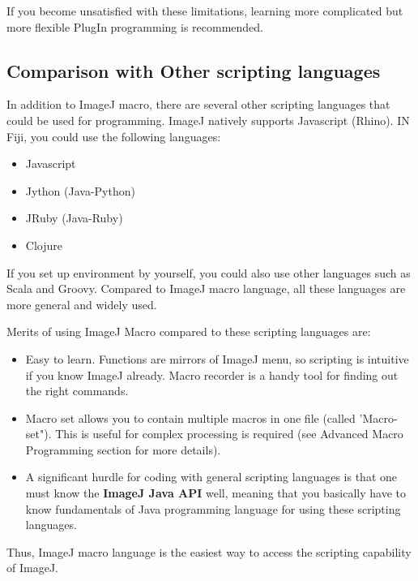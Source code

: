 \documentclass[11pt,a4paper,oneside]{report}
\begin{document}
If you become unsatisfied with these limitations, 
learning more complicated but more flexible PlugIn programming is recommended. 

\subsection{Comparison with Other scripting languages}
In addition to ImageJ macro, there are several other scripting languages that
could be used for programming. ImageJ natively supports Javascript (Rhino).
IN Fiji, you could use the following languages:

\begin{itemize}
 \item Javascript
 \item Jython (Java-Python)
 \item JRuby (Java-Ruby)
 \item Clojure
 \end{itemize}

If you set up environment by yourself, you could also use other languages such as Scala and Groovy. 
Compared to ImageJ macro language, all these languages are more general and widely used. 

Merits of using ImageJ Macro compared to these scripting languages are: 
\begin{itemize}
\item Easy to learn. 
Functions are mirrors of ImageJ menu, so scripting is intuitive if you know ImageJ already. 
Macro recorder is a handy tool for finding out the right commands. 

\item Macro set allows you to contain multiple macros in one file (called 'Macro-set"). 
This is useful for complex processing is required (see Advanced Macro Programming section for more details). 

\item A significant hurdle for coding with general scripting languages is that one must know the 
\textbf{ImageJ Java API} well, meaning that you basically have to know 
fundamentals of Java programming language for using these scripting languages. 
\end{itemize}

Thus, ImageJ macro language is the easiest way to access the scripting
capability of ImageJ.
\end{document}
